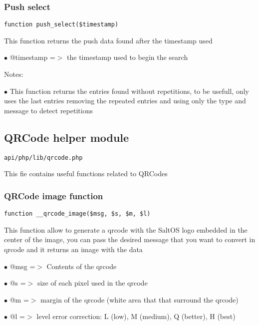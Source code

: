\documentclass[a4paper]{article}
\begin{document}
\hypertarget{toc518}{}
\subsubsection{Push select}

\begin{lstlisting}
function push_select($timestamp)
\end{lstlisting}

This function returns the push data found after the timestamp used

\begin{compactitem}
\item[\color{myblue}$\bullet$] @timestamp =$>$ the timestamp used to begin the search
\end{compactitem}

Notes:

\begin{compactitem}
\item[\color{myblue}$\bullet$] This function returns the entries found without repetitions, to be
  usefull, only uses the last entries removing the repeated entries and
  using only the type and message to detect repetitions
\end{compactitem}

\hypertarget{toc519}{}
\subsection{QRCode helper module}

\begin{lstlisting}
api/php/lib/qrcode.php
\end{lstlisting}

This fie contains useful functions related to QRCodes

\hypertarget{toc520}{}
\subsubsection{QRCode image function}

\begin{lstlisting}
function __qrcode_image($msg, $s, $m, $l)
\end{lstlisting}

This function allow to generate a qrcode with the SaltOS logo embedded
in the center of the image, you can pass the desired message that you
want to convert in qrcode and it returns an image with the data

\begin{compactitem}
\item[\color{myblue}$\bullet$] @msg =$>$ Contents of the qrcode
\item[\color{myblue}$\bullet$] @s   =$>$ size of each pixel used in the qrcode
\item[\color{myblue}$\bullet$] @m   =$>$ margin of the qrcode (white area that that surround the qrcode)
\item[\color{myblue}$\bullet$] @l   =$>$ level error correction: L (low), M (medium), Q (better), H (best)
\end{compactitem}
\end{document}
